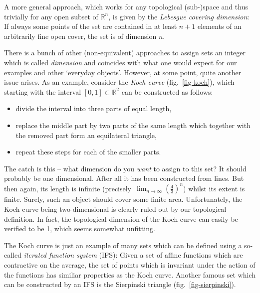 \documentclass[twocolumn, 10pt]{scrartcl}
\begin{document}
            A more general approach, which works for any topological (sub-)space and thus trivially for any open subset
            of $\mathbb{R}^n$, is given by the \emph{Lebesgue covering dimension}: If always some points of the set are
            contained in at least $n+1$ elements of an arbitrarily fine open cover, the set is of dimension $n$.

            There is a bunch of other (non-equivalent) approaches to assign sets an integer which is called
            \emph{dimension} and coincides with what one would expect for our examples and other `everyday objects'.
            However, at some point, quite another issue arises. As an example, consider the \emph{Koch curve}
            (fig.~\ref{fig-koch}), which starting with the interval $\left[0,1\right]\subset\mathbb{R}^2$ can be
            constructed as follows:
            \begin{itemize}
                \item divide the interval into three parts of equal length,
                \item replace the middle part by two parts of the same length which together with the removed part
                    form an equilateral triangle,
                \item repeat these steps for each of the smaller parts.
            \end{itemize}

            The catch is this -- what dimension do you \emph{want} to assign to this set? It should probably be
            one dimensional. After all it has been constructed from lines. But then again, its length is infinite
            (precisely~$\lim_{n\rightarrow\infty}\left(\frac{4}{3}\right)^n$) whilst its extent is finite. Surely, such
            an object should cover some finite area. Unfortunately, the Koch curve being two-dimensional is clearly
            ruled out by our topological definition. In fact, the topological dimension of the Koch curve can easily be
            verified to be 1, which seems somewhat unfitting.

            The Koch curve is just an example of many sets which can be defined using a so-called
            \emph{iterated function system} (IFS): Given a set of affine
            functions which are contractive on the average, the set of points which is invariant under the action
            of the functions has similiar properties as the Koch curve. Another famous set which can be constructed by
            an IFS is the Sierpinski triangle (fig.~\ref{fig-sierpinski}).
\end{document}
